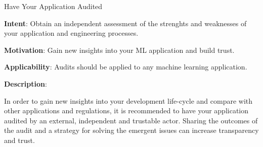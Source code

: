   
  \begin{frame}[plain]{ Have Your Application Audited
 }

  \textbf{Intent}: Obtain an independent assessment of the strenghts and weaknesses of your application and engineering processes.  
 

  \textbf{Motivation}: Gain new insights into your ML application and build trust.  
 

  \textbf{Applicability}: Audits should be applied to any machine learning application. 
 

  \textbf{Description}: 

In order to gain new insights into your development life-cycle and compare with other applications and regulations,
it is recommended to have your application audited by an external, independent and trustable actor.
Sharing the outcomes of the audit and a strategy for solving the emergent issues can increase transparency and trust.


 


  \end{frame}

